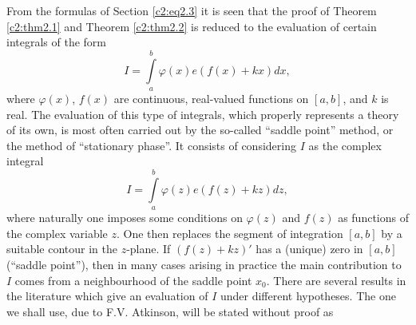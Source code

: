 From the formulas of Section \ref{c2:eq2.3} it is seen that the proof
of Theorem \ref{c2:thm2.1} and Theorem \ref{c2:thm2.2} is reduced to
the evaluation of certain integrals of the form
$$
I = \int\limits_a^b \varphi (x) e (f(x) + kx) dx,
$$
where $\varphi (x)$, $f(x)$ are continuous, real-valued functions on
$[a, b]$, and $k$ is real. The evaluation of this type of integrals,
which properly represents a theory of its own, is most often carried
out by the so-called ``saddle point'' method, or the method of
``stationary phase''. It consists of considering $I$ as the complex
integral
$$
I = \int\limits_a^b \varphi (z) e(f(z)+ kz)dz,
$$
where naturally one imposes some conditions on $\varphi (z)$ and
$f(z)$ as functions of the complex variable $z$. One then replaces the
segment of integration $[a, b]$ by a suitable contour in the
$z$-plane. If $(f(z)+ kz)'$ has a (unique) zero in $[a, b]$ (``saddle
point''), then in many cases arising in practice the main contribution
to $I$ comes from a neighbourhood of the saddle point $x_0$. There are
several results in the literature which give an evaluation of $I$
under different hypotheses. The one we shall use, due to
F.V. Atkinson, will be stated without proof as

